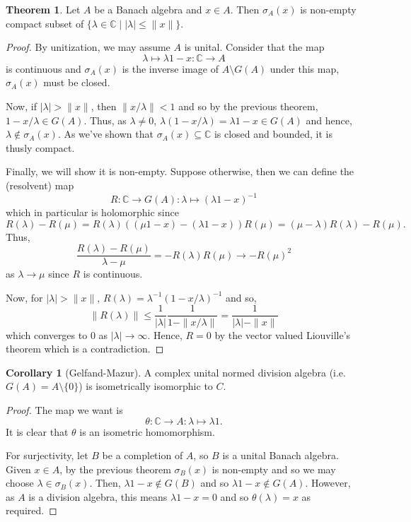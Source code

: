 \documentclass[]{article}
\theoremstyle{definition}
\newtheorem{theorem}{Theorem}
\newtheorem{corollary}{Corollary}[theorem]
\begin{document}
\begin{theorem}
  Let \(A\) be a Banach algebra and \(x \in A\). Then \(\sigma_A(x)\) is non-empty compact subset of 
  \(\{\lambda \in \mathbb{C} \mid |\lambda| \le \|x\|\}\). 
\end{theorem}
\begin{proof}
  By unitization, we may assume \(A\) is unital. Consider that the map 
  \[\lambda \mapsto \lambda 1 - x : \mathbb{C} \to A\]
  is continuous and \(\sigma_A(x)\) is the inverse image of \(A \setminus G(A)\) under this map, 
  \(\sigma_A(x)\) must be closed. 

  Now, if \(|\lambda| > \|x\|\), then \(\|x / \lambda\| < 1\) and so by the previous theorem, 
  \(1 - x / \lambda \in G(A)\). Thus, as \(\lambda \ne 0\), \(\lambda(1 - x / \lambda) = \lambda 1 - x \in G(A)\)
  and hence, \(\lambda \not \in \sigma_A(x)\). As we've shown that \(\sigma_A(x) \subseteq \mathbb{C}\) 
  is closed and bounded, it is thusly compact.

  Finally, we will show it is non-empty. Suppose otherwise, then we can define the (resolvent) map 
  \[R : \mathbb{C} \to G(A) : \lambda \mapsto (\lambda 1 - x)^{-1}\]
  which in particular is holomorphic since
  \[R(\lambda) - R(\mu) = R(\lambda)((\mu 1 - x) - (\lambda 1 - x))R(\mu)  = (\mu - \lambda)R(\lambda) - R(\mu).\]
  Thus, 
  \[\frac{R(\lambda) - R(\mu)}{\lambda - \mu} = -R(\lambda)R(\mu) \to -R(\mu)^2\]
  as \(\lambda \to \mu\) since \(R\) is continuous.

  Now, for \(|\lambda| > \|x\|\), \(R(\lambda) = \lambda^{-1}(1 - x / \lambda)^{-1}\) 
  and so, 
  \[\|R(\lambda)\| \le \frac{1}{|\lambda|} \frac{1}{1 - \|x / \lambda\|} = \frac{1}{|\lambda| - \|x\|}\]
  which converges to \(0\) as \(|\lambda| \to \infty\). Hence, \(R = 0\) by the vector valued Liouville's theorem 
  which is a contradiction.
\end{proof}

\begin{corollary}[Gelfand-Mazur]
  A complex unital normed division algebra (i.e. \(G(A) = A \setminus \{0\}\)) is isometrically isomorphic
  to \(C\).
\end{corollary}
\begin{proof}
  The map we want is
  \[\theta : \mathbb{C} \to A : \lambda \mapsto \lambda 1.\]
  It is clear that \(\theta\) is an isometric homomorphism. 
  
  For surjectivity, let \(B\) be a completion of \(A\), so \(B\) is a unital Banach algebra. Given 
  \(x \in A\), by the previous theorem \(\sigma_B(x)\) is non-empty and so we may choose \(\lambda \in \sigma_B(x)\).
  Then, \(\lambda 1 - x \not \in G(B)\) and so \(\lambda 1 - x \not \in G(A)\). However, as \(A\) is a 
  division algebra, this means \(\lambda 1 - x = 0\) and so \(\theta(\lambda) = x\) as required.
\end{proof}
\end{document}

